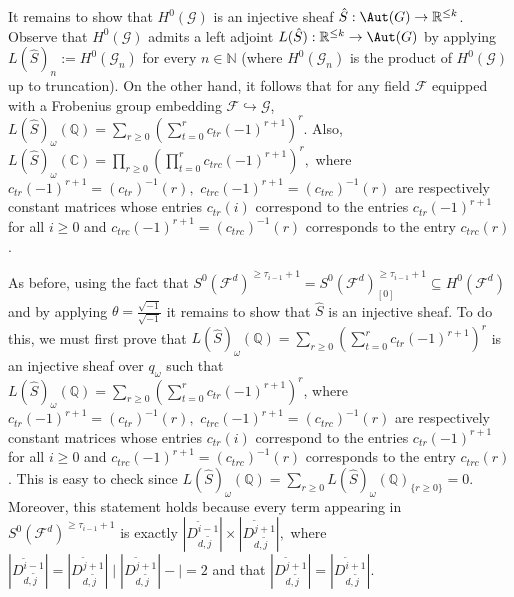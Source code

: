 \documentclass[a4paper,reqno,oneside]{article}
\begin{document}
It remains to show that $H^0(\mathcal{G})$ is an injective sheaf $\hat{S}: \Aut(G)\rightarrow \mathbb{R}^{\leq k}$. Observe that $H^0(\mathcal{G})$ admits a left adjoint $L(\hat{S}):\mathbb{R}^{\leq k}\rightarrow \Aut(G)$ by applying $L(\hat{S})_n:=H^0(\mathcal{G}_n)$ for every $n\in\mathbb{N}$ (where $H^0(\mathcal{G}_n)$ is the product of $H^0(\mathcal{G})$ up to truncation). On the other hand, it follows that for any field $\mathcal{F}$ equipped with a Frobenius group embedding $\mathcal{F}\hookrightarrow \mathcal{G}$, $L(\hat{S})_{\omega}(\mathbb{Q})=\sum_{r \geq 0} \left(\sum_{t=0}^{r} c_{tr}(-1)^{r+1}\right)^{r}$.  Also, $L(\hat{S})_{\omega}(\mathbb{C})=\prod_{r \geq 0} \left(\prod_{t=0}^{r} c_{trc}(-1)^{r+1}\right)^{r},$ where $c_{tr}(-1)^{r+1}=(c_{tr})^{-1}(r),$ $c_{trc}(-1)^{r+1}=(c_{trc})^{-1}(r)$ are respectively constant matrices whose entries $c_{tr}(i)$ correspond to the entries $c_{tr}(-1)^{r+1}$ for all $i\geq 0$ and $c_{trc}(-1)^{r+1}=(c_{trc})^{-1}(r)$ corresponds to the entry $c_{trc}(r)$. 

As before, using the fact that $S^0(\mathcal{F}^d)^{\geq \tau_{i-1}+1}=S^0(\mathcal{F}^d)^{\geq \tau_{i-1}+1}_{[0]}\subseteq H^0(\mathcal{F}^d)$ and by applying $\theta=\frac{\sqrt{-1}}{\sqrt{-1}}$ it remains to show that $\hat{S}$ is an injective sheaf. To do this, we must first prove that $L(\hat{S})_{\omega}(\mathbb{Q})=\sum_{r \geq 0} \left(\sum_{t=0}^{r} c_{tr}(-1)^{r+1}\right)^{r}$ is an injective sheaf over $q_{\omega}$ such that $L(\hat{S})_{\omega}(\mathbb{Q})=\sum_{r \geq 0} \left(\sum_{t=0}^{r} c_{tr}(-1)^{r+1}\right)^{r}$, where $c_{tr}(-1)^{r+1}=(c_{tr})^{-1}(r),$ $c_{trc}(-1)^{r+1}=(c_{trc})^{-1}(r)$ are respectively constant matrices whose entries $c_{tr}(i)$ correspond to the entries $c_{tr}(-1)^{r+1}$ for all $i\geq 0$ and $c_{trc}(-1)^{r+1}=(c_{trc})^{-1}(r)$ corresponds to the entry $c_{trc}(r)$. This is easy to check since $L(\hat{S})_{\omega}(\mathbb{Q})=\sum_{r \geq 0} L(\hat{S})_{\omega}(\mathbb{Q})_{\{r \geq 0\}}=0$. Moreover, this statement holds because every term appearing in $S^0(\mathcal{F}^d)^{\geq \tau_{i-1}+1}$ is exactly $|D_{d,\tilde{j}}^{\tilde{i}-1}| \times |D_{d,\tilde{j}}^{\tilde{j}+1}|,$ where $|D_{d,\tilde{j}}^{\tilde{i}-1}| = |D_{d,\tilde{j}}^{\tilde{j}+1}| \mid |D_{d,\tilde{j}}^{\tilde{j}+1}|-\mid = 2$ and that $|D_{d,\tilde{j}}^{\tilde{j}+1}|= |D_{d,\tilde{j}}^{\tilde{i}+1}|.$ 
\end{document}
